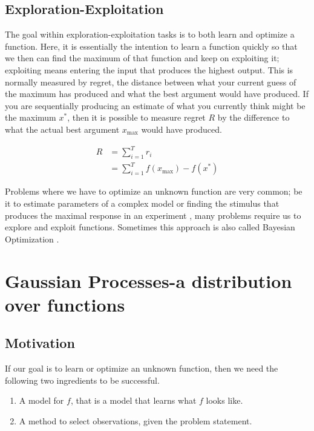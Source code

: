\documentclass[authoryear,11pt,review]{elsarticle}
\begin{document}
\subsection{Exploration-Exploitation}
The goal within exploration-exploitation tasks is to both learn and optimize a function. Here, it is essentially the intention to learn a function quickly so that we then can find the maximum of that function and keep on exploiting it; exploiting means entering the input that produces the highest output. This is normally measured by regret, the distance between what your current guess of the maximum has produced and what the best argument would have produced. If you are sequentially producing an estimate of what you currently think might be the maximum $x^*$, then it is possible to measure regret $R$ by the difference to what the actual best argument $x_{\text{max}}$ would have produced.

\begin{align*}
R&=\sum_{i=1}^{T}r_i\\
&=\sum_{i=1}^{T}f(x_{\text{max}})-f(x^*)
\end{align*}

Problems where we have to optimize an unknown function are very common; be it to estimate parameters of a complex model \citep{snoek2012practical} or finding the stimulus that produces the maximal response in an experiment \citep{daunizeau2011optimizing}, many problems require us to explore and exploit functions. Sometimes this approach is also called Bayesian Optimization \citep{brochu2010tutorial}.

\section{Gaussian Processes-a distribution over functions}
\subsection{Motivation}
If our goal is to learn or optimize an unknown function, then we need the following two ingredients to be successful.

\begin{enumerate}
\item A model for $f$, that is a model that learns what $f$ looks like.
\item A method to select observations, given the problem statement.
\end{enumerate}
\end{document}
